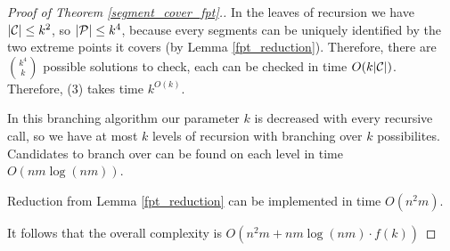 \begin{proof}[Proof of Theorem \ref{segment_cover_fpt}.]
In the leaves of recursion we have $|\mathcal{C}| \le k^2$, so $|\mathcal{P}| \le k^4$, because
every segments can be uniquely identified by the two extreme points it covers
(by Lemma \ref{fpt_reduction}). Therefore, there are $\binom{k^4}{k}$
possible solutions to check, each can be checked in time $O(k|\mathcal{C}|)$.
Therefore, (3) takes time $k^{O(k)}$.


In this branching algorithm our parameter $k$ is decreased with every
recursive call, so we have at most $k$ levels of recursion with
branching over $k$ possibilites. Candidates to branch over
can be found on each level in time $O(nm \log(nm))$.

Reduction from Lemma \ref{fpt_reduction} can be implemented in time $O(n^2m)$.

It follows that the overall complexity is $O(n^2m + nm \log(nm) \cdot f(k))$
\end{proof}

